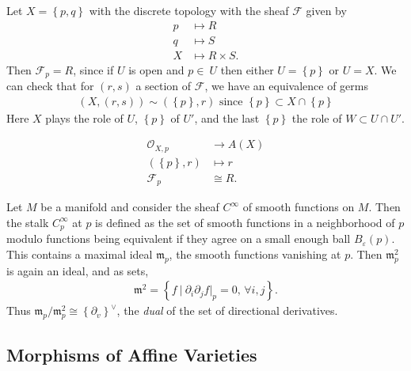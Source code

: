 \begin{example}

Let \(X = \left\{{p, q}\right\}\) with the discrete topology with the
sheaf \(\mathcal{F}\) given by
\begin{align*}  
p &\mapsto R \\
q &\mapsto S \\
X &\mapsto R\times S
.\end{align*}
Then \(\mathcal{F}_p = R\), since if \(U\) is open and \(p\in\ U\) then
either \(U= \left\{{p}\right\}\) or \(U = X\). We can check that for
\((r, s)\) a section of \(\mathcal{F}\), we have an equivalence of germs
\begin{align*}
(X, (r, s)) \sim (\left\{{p}\right\}, r) \text{ since } \left\{{p}\right\} \subset X\cap\left\{{p}\right\}
\end{align*}
Here \(X\) plays the role of \(U\), \(\left\{{p}\right\}\) of \(U'\),
and the last \(\left\{{p}\right\}\) the role of \(W \subset U\cap U'\).

\begin{align*}  
{\mathcal{O}}_{X, p} &\to A(X) \\
(\left\{{p}\right\}, r) &\mapsto r \\
\mathcal{F}_p &\cong R
.\end{align*}

\end{example}

\begin{example}

Let \(M\) be a manifold and consider the sheaf \(C^\infty\) of smooth
functions on \(M\). Then the stalk \(C_p^\infty\) at \(p\) is defined as
the set of smooth functions in a neighborhood of \(p\) modulo functions
being equivalent if they agree on a small enough ball
\(B_\varepsilon(p)\). This contains a maximal ideal
\({\mathfrak{m}}_p\), the smooth functions vanishing at \(p\). Then
\({\mathfrak{m}}_p^2\) is again an ideal, and as sets,
\begin{align*}  
{\mathfrak{m}}^2 = \left\{{f {~\mathrel{\Big|}~}{\partial}_i {\partial}_j f\mathrel{\Big|}_p = 0,\, \forall i,j}\right\}
.\end{align*}
Thus
\({\mathfrak{m}}_p/{\mathfrak{m}}_p^2 \cong \left\{{{\partial}_v}\right\}^\vee\),
the \emph{dual} of the set of directional derivatives.

\end{example}

\hypertarget{morphisms-of-affine-varieties}{%
\subsection{Morphisms of Affine
Varieties}\label{morphisms-of-affine-varieties}}

